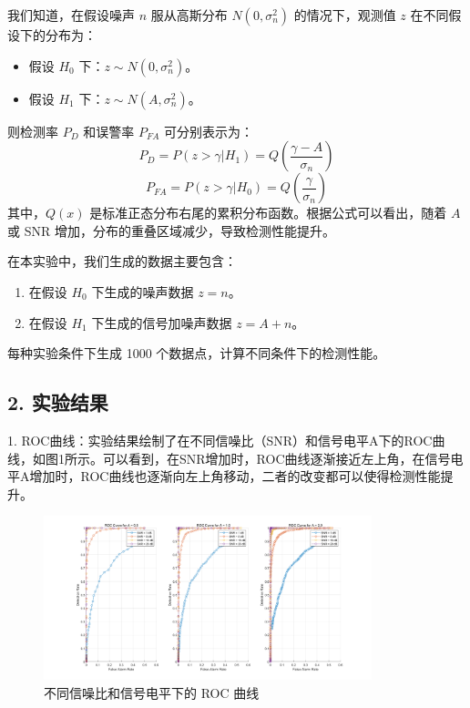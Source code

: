 \documentclass[12pt]{ctexart}
\begin{document}
我们知道，在假设噪声 \( n \) 服从高斯分布 \( N(0, \sigma_n^2) \) 的情况下，观测值 \( z \) 在不同假设下的分布为：
\begin{itemize}
    \item 假设 \( H_0 \) 下：\( z \sim N(0, \sigma_n^2) \)。
    \item 假设 \( H_1 \) 下：\( z \sim N(A, \sigma_n^2) \)。
\end{itemize}

则检测率 \( P_D \) 和误警率 \( P_{FA} \) 可分别表示为：
\[
P_D = P(z > \gamma | H_1) = Q\left(\frac{\gamma - A}{\sigma_n}\right)
\]
\[
P_{FA} = P(z > \gamma | H_0) = Q\left(\frac{\gamma}{\sigma_n}\right)
\]
其中，\( Q(x) \) 是标准正态分布右尾的累积分布函数。根据公式可以看出，随着 \( A \) 或 SNR 增加，分布的重叠区域减少，导致检测性能提升。

在本实验中，我们生成的数据主要包含：

\begin{enumerate}
    \item 在假设 \( H_0 \) 下生成的噪声数据 \( z = n \)。
    \item 在假设 \( H_1 \) 下生成的信号加噪声数据 \( z = A + n \)。
\end{enumerate}

每种实验条件下生成 1000 个数据点，计算不同条件下的检测性能。

\subsection*{2. 实验结果}

1. ROC曲线：实验结果绘制了在不同信噪比（SNR）和信号电平A下的ROC曲线，如图1所示。可以看到，在SNR增加时，ROC曲线逐渐接近左上角，在信号电平A增加时，ROC曲线也逐渐向左上角移动，二者的改变都可以使得检测性能提升。

\begin{figure}[H]
    \centering
    \includegraphics[width=0.85\textwidth]{image/output1.png}
    \caption{不同信噪比和信号电平下的 ROC 曲线}
    \label{fig:roc}
\end{figure}
\end{document}

